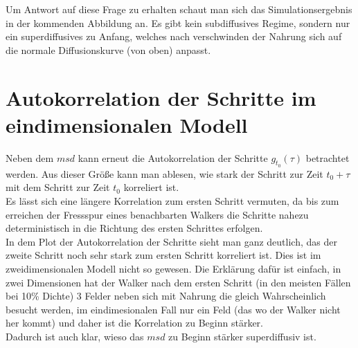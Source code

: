 \documentclass[a4paper, 12pt]{report}
\begin{document}
\newpage

\noindent Um Antwort auf diese Frage zu erhalten schaut man sich das Simulationsergebnis in der kommenden Abbildung an. Es gibt kein subdiffusives Regime, sondern nur ein superdiffusives zu Anfang, welches nach verschwinden der Nahrung sich auf die normale Diffusionskurve (von oben) anpasst.

\section{Autokorrelation der Schritte im eindimensionalen Modell}
Neben dem $msd$ kann erneut die Autokorrelation der Schritte $g_{t_0}(\tau)$ betrachtet werden. Aus dieser Größe kann man ablesen, wie stark der Schritt zur Zeit $t_0 + \tau$ mit dem Schritt zur Zeit $t_0$ korreliert ist.
\\
\noindent Es lässt sich eine längere Korrelation zum ersten Schritt vermuten, da bis zum erreichen der Fressspur eines benachbarten Walkers die Schritte nahezu deterministisch in die Richtung des ersten Schrittes erfolgen.
\\
\noindent In dem Plot der Autokorrelation der Schritte sieht man ganz deutlich, das der zweite Schritt noch sehr stark zum ersten Schritt korreliert ist. Dies ist im zweidimensionalen Modell nicht so gewesen. Die Erklärung dafür ist einfach, in zwei Dimensionen hat der Walker nach dem ersten Schritt (in den meisten Fällen bei 10\% Dichte) 3 Felder neben sich mit Nahrung die gleich Wahrscheinlich besucht werden, im eindimesionalen Fall nur ein Feld (das wo der Walker nicht her kommt) und daher ist die Korrelation zu Beginn stärker. 
\\
Dadurch ist auch klar, wieso das $msd$ zu Beginn stärker superdiffusiv ist.
\end{document}
